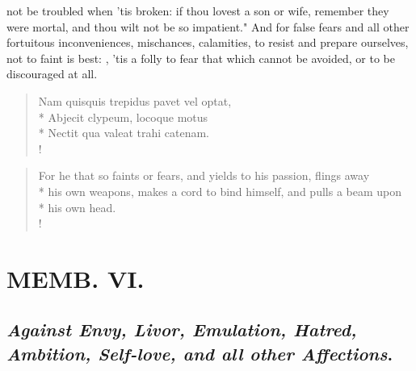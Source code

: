 {not be troubled when 'tis broken: if thou lovest a son or wife, remember they were mortal, and thou wilt not be so impatient." And for false fears and all other fortuitous inconveniences, mischances, calamities, to resist and prepare ourselves, not to faint is best: , 'tis a folly to fear that which cannot be avoided, or to be discouraged at all.

\begin{latin}%
\begin{verse}%
Nam quisquis trepidus pavet vel optat,\\*
Abjecit clypeum, locoque motus\\*
Nectit qua valeat trahi catenam.\\!
\end{verse}%
\end{latin}%
\begin{verse}%
For he that so faints or fears, and yields to his passion, flings away\\*
his own weapons, makes a cord to bind himself, and pulls a beam upon\\*
his own head.\\!
\end{verse}%


\chapter{ MEMB. VI.}


\section{\emph{Against Envy, Livor, Emulation, Hatred, Ambition, Self-love, and all other Affections}.}


}
